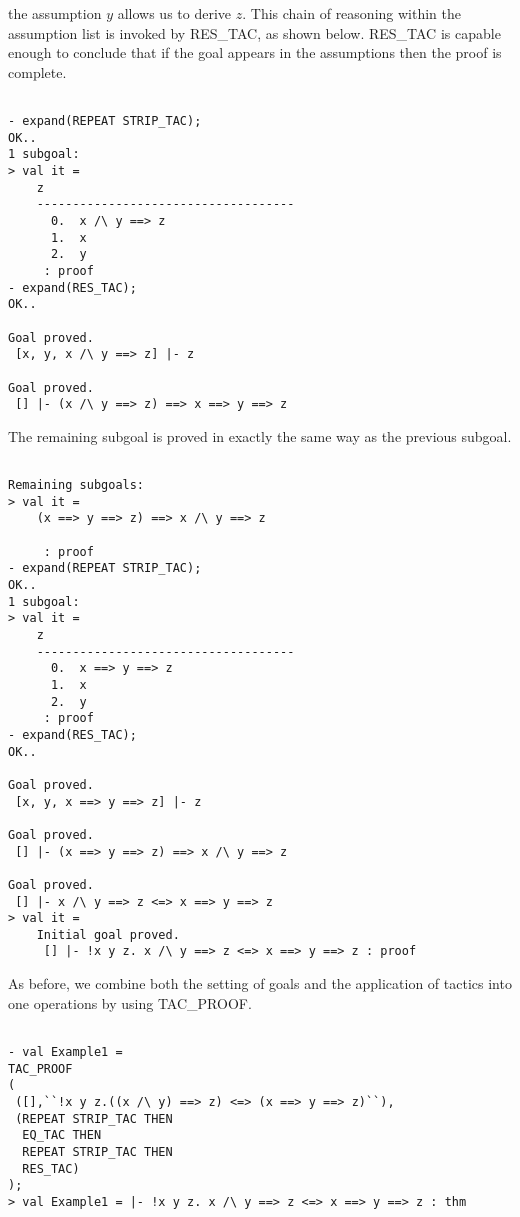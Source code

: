 the assumption $y$ allows us to derive $z$. This chain of reasoning
within the assumption list is invoked by RES\_TAC, as shown
below. RES\_TAC is capable enough to conclude that if the goal appears
in the assumptions then the proof is complete.
\begin{session} 
  \begin{scriptsize}
\begin{verbatim}

- expand(REPEAT STRIP_TAC);
OK..
1 subgoal:
> val it =
    z
    ------------------------------------
      0.  x /\ y ==> z
      1.  x
      2.  y
     : proof
- expand(RES_TAC);
OK..

Goal proved.
 [x, y, x /\ y ==> z] |- z

Goal proved.
 [] |- (x /\ y ==> z) ==> x ==> y ==> z
\end{verbatim}
  \end{scriptsize}
\end{session}
The remaining subgoal is proved in exactly the same way as the
previous subgoal.
\begin{session}
  \begin{scriptsize}
\begin{verbatim}

Remaining subgoals:
> val it =
    (x ==> y ==> z) ==> x /\ y ==> z
    
     : proof
- expand(REPEAT STRIP_TAC);
OK..
1 subgoal:
> val it =
    z
    ------------------------------------
      0.  x ==> y ==> z
      1.  x
      2.  y
     : proof
- expand(RES_TAC);
OK..

Goal proved.
 [x, y, x ==> y ==> z] |- z

Goal proved.
 [] |- (x ==> y ==> z) ==> x /\ y ==> z

Goal proved.
 [] |- x /\ y ==> z <=> x ==> y ==> z
> val it =
    Initial goal proved.
     [] |- !x y z. x /\ y ==> z <=> x ==> y ==> z : proof
\end{verbatim}
  \end{scriptsize}
\end{session}
As before, we combine both the setting of goals and the application of
tactics into one operations by using TAC\_PROOF.
\begin{session}
  \begin{scriptsize}
\begin{verbatim}

- val Example1 = 
TAC_PROOF
(
 ([],``!x y z.((x /\ y) ==> z) <=> (x ==> y ==> z)``),
 (REPEAT STRIP_TAC THEN
  EQ_TAC THEN
  REPEAT STRIP_TAC THEN
  RES_TAC)
);
> val Example1 = |- !x y z. x /\ y ==> z <=> x ==> y ==> z : thm
\end{verbatim}
  \end{scriptsize}
\end{session}

